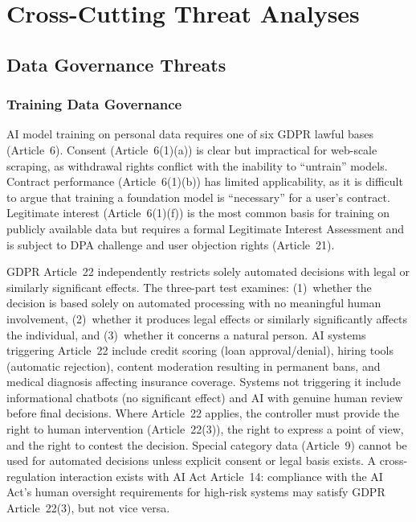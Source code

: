 \documentclass[11pt,a4paper]{article}
\begin{document}
\section{Cross-Cutting Threat Analyses}
\label{sec:cross-cutting}

\subsection{Data Governance Threats}

\subsubsection{Training Data Governance}

AI model training on personal data requires one of six GDPR lawful bases (Article~6). Consent (Article~6(1)(a)) is clear but impractical for web-scale scraping, as withdrawal rights conflict with the inability to ``untrain'' models. Contract performance (Article~6(1)(b)) has limited applicability, as it is difficult to argue that training a foundation model is ``necessary'' for a user's contract. Legitimate interest (Article~6(1)(f)) is the most common basis for training on publicly available data but requires a formal Legitimate Interest Assessment and is subject to DPA challenge and user objection rights (Article~21).

GDPR Article~22 independently restricts solely automated decisions with legal or similarly significant effects. The three-part test examines: (1)~whether the decision is based solely on automated processing with no meaningful human involvement, (2)~whether it produces legal effects or similarly significantly affects the individual, and (3)~whether it concerns a natural person. AI systems triggering Article~22 include credit scoring (loan approval/denial), hiring tools (automatic rejection), content moderation resulting in permanent bans, and medical diagnosis affecting insurance coverage. Systems not triggering it include informational chatbots (no significant effect) and AI with genuine human review before final decisions. Where Article~22 applies, the controller must provide the right to human intervention (Article~22(3)), the right to express a point of view, and the right to contest the decision. Special category data (Article~9) cannot be used for automated decisions unless explicit consent or legal basis exists. A cross-regulation interaction exists with AI Act Article~14: compliance with the AI Act's human oversight requirements for high-risk systems may satisfy GDPR Article~22(3), but not vice versa.
\end{document}
